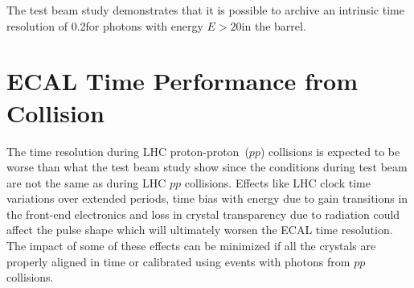 \vspace{5mm}

The test beam study demonstrates that it is possible to archive an intrinsic time resolution of 0.2\ns for photons with energy $E > 20$\GeV in the barrel.%

\section{ECAL Time Performance from Collision}
The time resolution during LHC proton-proton~($pp$) collisions is expected to be worse than what the test beam study show since the conditions during test beam are not the same as during LHC $pp$ collisions. Effects like LHC clock time variations over extended periods, time bias with energy due to gain transitions in the front-end electronics and loss in crystal transparency due to radiation could affect the pulse shape which will ultimately worsen the ECAL time resolution. The impact of some of these effects can be minimized if all the crystals are properly aligned in time or calibrated using events with photons from $pp$ collisions. 

